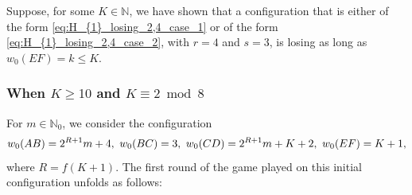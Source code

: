 \documentclass[11pt,reqno]{amsart}
\theoremstyle{definition}
\theoremstyle{definition}
\begin{document}
Suppose, for some $K \in \mathbb{N}$, we have shown that a configuration that is either of the form \eqref{eq:H_{1}_losing_2,4_case_1} or of the form \eqref{eq:H_{1}_losing_2,4_case_2}, with $r=4$ and $s=3$, is losing as long as $w_{0}(EF)=k \leqslant K$.

\subsubsection{When $K \geqslant 10$ and $K \equiv 2 \bmod 8$} For $m \in \mathbb{N}_{0}$, we consider the configuration
\begin{equation}
w_{0}(AB)=2^{R+1}m+4,\ w_{0}(BC)=3,\ w_{0}(CD)=2^{R+1}m+K+2,\ w_{0}(EF)=K+1,\label{eq:H_{1}_losing_4_6_inductive}
\end{equation}
where $R=f(K+1)$. The first round of the game played on this initial configuration unfolds as follows:
\end{document}
